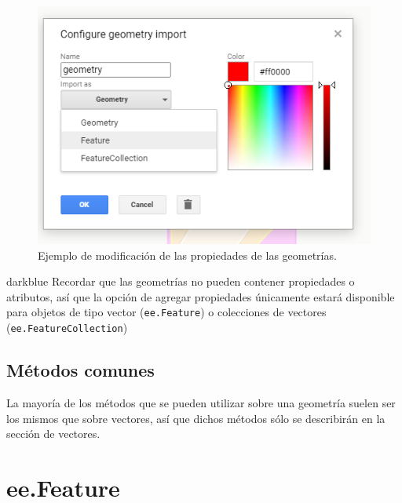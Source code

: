 \documentclass[
  12pt,
  letterpaper,
  twoside]{book}
\begin{document}
\begin{figure}[btp]

{\centering \includegraphics[width=0.8\linewidth]{Img/menuGeo} 

}

\caption{Ejemplo de modificación de las propiedades de las geometrías.}\label{fig:unnamed-chunk-72}
\end{figure}

\begin{bluebox2}

\begin{awesomeblock}{5pt}{\faLightbulb}{darkblue}
Recordar que las geometrías no pueden contener propiedades o atributos, así que la opción de agregar propiedades únicamente estará disponible para objetos de tipo vector (\texttt{ee.Feature}) o colecciones de vectores (\texttt{ee.FeatureCollection})

\end{awesomeblock}

\end{bluebox2}

\hypertarget{muxe9todos-comunes}{%
\section{Métodos comunes}\label{muxe9todos-comunes}}

La mayoría de los métodos que se pueden utilizar sobre una geometría suelen ser los mismos que sobre vectores, así que dichos métodos sólo se describirán en la sección de vectores.

\newpage

\hypertarget{ee.feature-1}{%
\chapter{ee.Feature}\label{ee.feature-1}}
\end{document}
